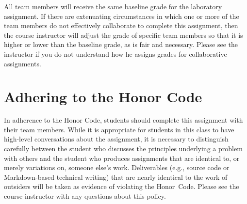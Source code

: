 \documentclass[11pt]{article}
\begin{document}
All team members will receive the same baseline grade for the laboratory assignment. If there are extenuating
circumstances in which one or more of the team members do not effectively collaborate to complete this assignment, then
the course instructor will adjust the grade of specific team members so that it is higher or lower than the baseline
grade, as is fair and necessary. Please see the instructor if you do not understand how he assigns grades for
collaborative assignments.

\section*{Adhering to the Honor Code}

In adherence to the Honor Code, students should complete this assignment with their team members. While it is
appropriate for students in this class to have high-level conversations about the assignment, it is necessary to
distinguish carefully between the student who discusses the principles underlying a problem with others and the student
who produces assignments that are identical to, or merely variations on, someone else's work. Deliverables (e.g., source
code or Markdown-based technical writing) that are nearly identical to the work of outsiders will be taken as evidence
of violating the \mbox{Honor Code}. Please see the course instructor with any questions about this policy.
\end{document}
